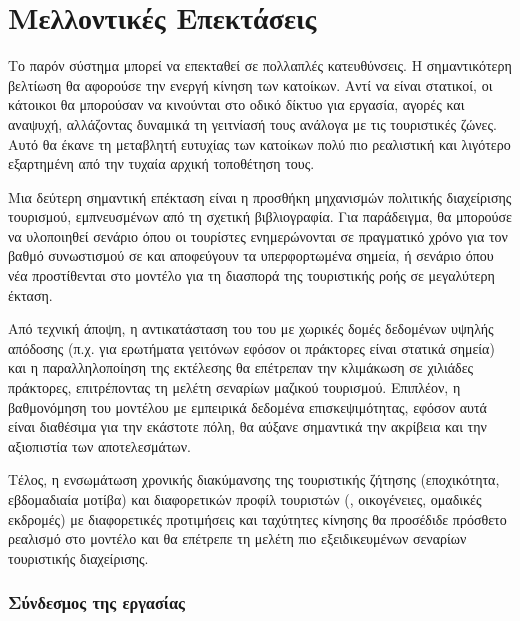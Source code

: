 \section{Μελλοντικές Επεκτάσεις}

Το παρόν σύστημα μπορεί να επεκταθεί σε πολλαπλές κατευθύνσεις. Η
σημαντικότερη βελτίωση θα αφορούσε την ενεργή κίνηση των κατοίκων.
Aντί να είναι στατικοί, οι κάτοικοι θα μπορούσαν να κινούνται στο
οδικό δίκτυο για εργασία, αγορές και αναψυχή, αλλάζοντας δυναμικά
τη γειτνίασή τους ανάλογα με τις τουριστικές ζώνες. Αυτό θα έκανε
τη μεταβλητή ευτυχίας των κατοίκων πολύ πιο ρεαλιστική και λιγότερο
εξαρτημένη από την τυχαία αρχική τοποθέτηση τους.

Μια δεύτερη σημαντική επέκταση είναι η προσθήκη μηχανισμών πολιτικής
διαχείρισης τουρισμού, εμπνευσμένων από τη σχετική βιβλιογραφία.
Για παράδειγμα, θα μπορούσε να υλοποιηθεί σενάριο όπου οι τουρίστες
ενημερώνονται σε πραγματικό χρόνο για τον βαθμό συνωστισμού σε
 και αποφεύγουν τα υπερφορτωμένα σημεία, ή σενάριο όπου νέα
 προστίθενται στο μοντέλο για τη διασπορά της
τουριστικής ροής σε μεγαλύτερη έκταση.

Από τεχνική άποψη, η αντικατάσταση του  του
 με χωρικές δομές δεδομένων υψηλής απόδοσης
(π.χ.  για ερωτήματα γειτόνων εφόσον οι πράκτορες είναι
στατικά σημεία) και η παραλληλοποίηση της εκτέλεσης θα επέτρεπαν την
κλιμάκωση σε χιλιάδες πράκτορες, επιτρέποντας τη μελέτη σεναρίων
μαζικού τουρισμού. Επιπλέον, η βαθμονόμηση του μοντέλου με εμπειρικά
δεδομένα επισκεψιμότητας, εφόσον αυτά είναι διαθέσιμα για την
εκάστοτε πόλη, θα αύξανε σημαντικά την ακρίβεια και την αξιοπιστία
των αποτελεσμάτων.

Τέλος, η ενσωμάτωση χρονικής διακύμανσης της τουριστικής ζήτησης
(εποχικότητα, εβδομαδιαία μοτίβα) και διαφορετικών προφίλ τουριστών
(, οικογένειες, ομαδικές εκδρομές) με διαφορετικές
προτιμήσεις  και ταχύτητες κίνησης θα προσέδιδε πρόσθετο
ρεαλισμό στο μοντέλο και θα επέτρεπε τη μελέτη πιο εξειδικευμένων
σεναρίων τουριστικής διαχείρισης.

\subsubsection{Σύνδεσμος της εργασίας}
